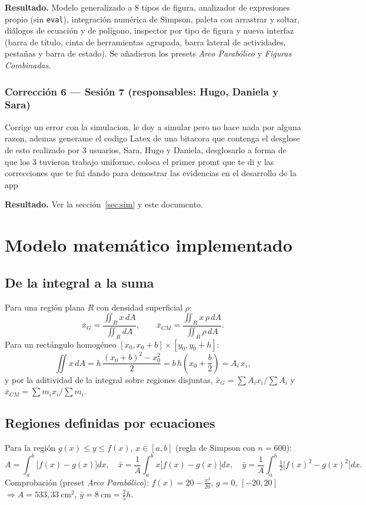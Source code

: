 \documentclass[11pt,a4paper]{article}
\begin{document}
\textbf{Resultado.} Modelo generalizado a 8 tipos de figura, analizador de expresiones propio (sin
\texttt{eval}), integración numérica de Simpson, paleta con arrastrar y soltar, diálogos de ecuación y de
polígono, inspector por tipo de figura y nueva interfaz (barra de título, cinta de herramientas agrupada,
barra lateral de actividades, pestañas y barra de estado). Se añadieron los presets \emph{Arco Parabólico}
y \emph{Figuras Combinadas}.

\subsubsection*{Corrección 6 — Sesión 7 (responsables: Hugo, Daniela y Sara)}
\begin{Prompt}
Corrige un error con la simulacion, le doy a simular pero no hace nada por alguna razon, ademas generame el codigo Latex de una bitacora que contenga el desglose de esto realizado por 3 usuarios, Sara, Hugo y Daniela, desglosarlo a forma de que los 3 tuvieron trabajo uniforme, coloca el primer promt que te di y las correcciones que te fui dando para demostrar las evidencias en el desarrollo de la app
\end{Prompt}
\textbf{Resultado.} Ver la sección~\ref{sec:sim} y este documento.

\section{Modelo matemático implementado}

\subsection{De la integral a la suma}
Para una región plana $R$ con densidad superficial $\rho$:
\[
\bar x_G=\frac{\iint_R x\,dA}{\iint_R dA},\qquad
\bar x_{CM}=\frac{\iint_R x\,\rho\,dA}{\iint_R \rho\,dA}.
\]
Para un rectángulo homogéneo $[x_0,x_0+b]\times[y_0,y_0+h]$:
\[
\iint x\,dA = h\,\frac{(x_0+b)^2-x_0^2}{2}= b\,h\left(x_0+\frac b2\right)=A_i\,x_i,
\]
y por la aditividad de la integral sobre regiones disjuntas,
$\bar x_G=\sum A_i x_i/\sum A_i$ y $\bar x_{CM}=\sum m_i x_i/\sum m_i$.

\subsection{Regiones definidas por ecuaciones}
Para la región $g(x)\le y\le f(x)$, $x\in[a,b]$ (regla de Simpson con $n=600$):
\[
A=\int_a^b\!\big[f(x)-g(x)\big]dx,\quad
\bar x=\frac1A\int_a^b\! x\big[f(x)-g(x)\big]dx,\quad
\bar y=\frac1A\int_a^b\!\tfrac12\big[f(x)^2-g(x)^2\big]dx .
\]
Comprobación (preset \emph{Arco Parabólico}): $f(x)=20-\tfrac{x^2}{20}$, $g=0$, $[-20,20]$
$\Rightarrow A=533{,}33\ \text{cm}^2$, $\bar y=8\ \text{cm}=\tfrac25 h$.
\end{document}
